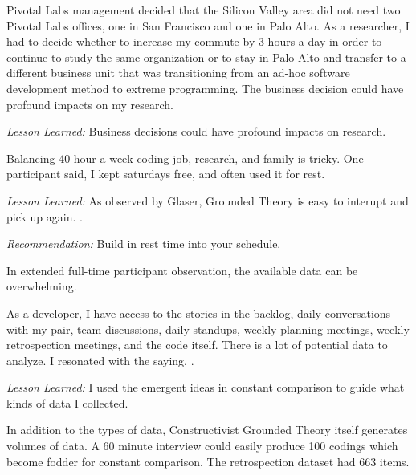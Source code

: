 Pivotal Labs management decided that the Silicon Valley area did not need two Pivotal Labs offices, one in San Francisco and one in Palo Alto. As a researcher, I had to decide whether to increase my commute by 3 hours a day in order to continue to study the same organization or to stay in Palo Alto and transfer to a different business unit that was transitioning from an ad-hoc software development method to extreme programming. The business decision could have profound impacts on my research. 

\textit{Lesson Learned:} Business decisions could have profound impacts on research. 

Balancing 40 hour a week coding job, research, and family is tricky. One participant said,  I kept saturdays free, and often used it for rest. 

\textit{Lesson Learned:} As observed by Glaser, Grounded Theory is easy to interupt and pick up again.  \cite{GlaserIssues}.

\textit{Recommendation:} Build in rest time into your schedule.






In extended full-time participant observation, the available data can be overwhelming.

As a developer, I have access to the stories in the backlog, daily conversations with my pair, team discussions, daily standups, weekly planning meetings, weekly retrospection meetings,   and the code itself. There is a lot of potential data to analyze. I resonated with the saying,  \cite{Charmaz}.

\textit{Lesson Learned:} I used the emergent ideas in constant comparison to guide what kinds of data I collected.

In addition to the types of data, Constructivist Grounded Theory itself generates volumes of data. A 60 minute interview could easily produce 100 codings which become fodder for constant comparison. The retrospection dataset had 663 items.


